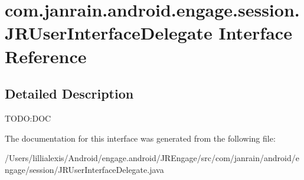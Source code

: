 \hypertarget{interfacecom_1_1janrain_1_1android_1_1engage_1_1session_1_1_j_r_user_interface_delegate}{
\section{com.janrain.android.engage.session.JRUserInterfaceDelegate Interface Reference}
\label{interfacecom_1_1janrain_1_1android_1_1engage_1_1session_1_1_j_r_user_interface_delegate}
}


\subsection{Detailed Description}
TODO:DOC 

The documentation for this interface was generated from the following file:\begin{DoxyCompactItemize}
\item 
/Users/lillialexis/Android/engage.android/JREngage/src/com/janrain/android/engage/session/JRUserInterfaceDelegate.java\end{DoxyCompactItemize}
